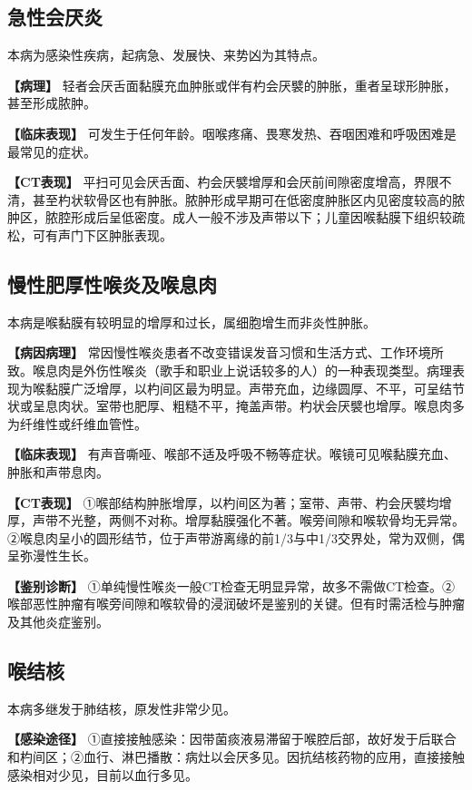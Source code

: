 \subsection{急性会厌炎}

本病为感染性疾病，起病急、发展快、来势凶为其特点。

\textbf{【病理】}
轻者会厌舌面黏膜充血肿胀或伴有杓会厌襞的肿胀，重者呈球形肿胀，甚至形成脓肿。

\textbf{【临床表现】}
可发生于任何年龄。咽喉疼痛、畏寒发热、吞咽困难和呼吸困难是最常见的症状。

\textbf{【CT表现】}
平扫可见会厌舌面、杓会厌襞增厚和会厌前间隙密度增高，界限不清，甚至杓状软骨区也有肿胀。脓肿形成早期可在低密度肿胀区内见密度较高的脓肿区，脓腔形成后呈低密度。成人一般不涉及声带以下；儿童因喉黏膜下组织较疏松，可有声门下区肿胀表现。

\subsection{慢性肥厚性喉炎及喉息肉}

本病是喉黏膜有较明显的增厚和过长，属细胞增生而非炎性肿胀。

\textbf{【病因病理】}
常因慢性喉炎患者不改变错误发音习惯和生活方式、工作环境所致。喉息肉是外伤性喉炎（歌手和职业上说话较多的人）的一种表现类型。病理表现为喉黏膜广泛增厚，以杓间区最为明显。声带充血，边缘圆厚、不平，可呈结节状或呈息肉状。室带也肥厚、粗糙不平，掩盖声带。杓状会厌襞也增厚。喉息肉多为纤维性或纤维血管性。

\textbf{【临床表现】}
有声音嘶哑、喉部不适及呼吸不畅等症状。喉镜可见喉黏膜充血、肿胀和声带息肉。

\textbf{【CT表现】}
①喉部结构肿胀增厚，以杓间区为著；室带、声带、杓会厌襞均增厚，声带不光整，两侧不对称。增厚黏膜强化不著。喉旁间隙和喉软骨均无异常。②喉息肉呈小的圆形结节，位于声带游离缘的前1/3与中1/3交界处，常为双侧，偶呈弥漫性生长。

\textbf{【鉴别诊断】}
①单纯慢性喉炎一般CT检查无明显异常，故多不需做CT检查。②喉部恶性肿瘤有喉旁间隙和喉软骨的浸润破坏是鉴别的关键。但有时需活检与肿瘤及其他炎症鉴别。

\subsection{喉结核}

本病多继发于肺结核，原发性非常少见。

\textbf{【感染途径】}
①直接接触感染：因带菌痰液易滞留于喉腔后部，故好发于后联合和杓间区；②血行、淋巴播散：病灶以会厌多见。因抗结核药物的应用，直接接触感染相对少见，目前以血行多见。

